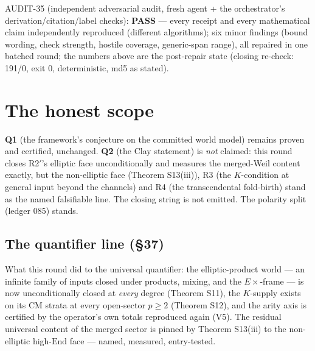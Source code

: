 \documentclass[11pt]{article}
\newcommand{\End}{\mathrm{End}}
\begin{document}
AUDIT-35 (independent adversarial audit, fresh agent + the orchestrator's
derivation/citation/label checks): \textbf{PASS} --- every receipt and
every mathematical claim independently reproduced (different algorithms);
six minor findings (bound wording, check strength, hostile coverage,
generic-span range), all repaired in one batched round; the numbers above
are the post-repair state (closing re-check: 191/0, exit 0, deterministic,
md5 as stated).

\section{The honest scope}

\textbf{Q1} (the framework's conjecture on the committed world model)
remains proven and certified, unchanged. \textbf{Q2} (the Clay
statement) is \emph{not} claimed: this round closes R2$'$'s elliptic
face unconditionally and measures the merged-Weil content exactly, but
the non-elliptic face (Theorem S13(iii)), R3 (the $K$-condition at
general input beyond the channels) and R4 (the transcendental
fold-birth) stand as the named falsifiable line. The closing string is
not emitted. The polarity split (ledger 085) stands.

\subsection*{The quantifier line (\S37)}
What this round did to the universal quantifier: the elliptic-product
world --- an infinite family of inputs closed under products, mixing,
and the $E\times$-frame --- is now unconditionally closed at \emph{every}
degree (Theorem S11), the $K$-supply exists on its CM strata at every
open-sector $p\ge2$ (Theorem S12), and the arity axis is certified by
the operator's own totals reproduced again (V5). The residual
universal content of the merged sector is pinned by Theorem S13(iii) to
the non-elliptic high-$\End$ face --- named, measured, entry-tested.
\end{document}
